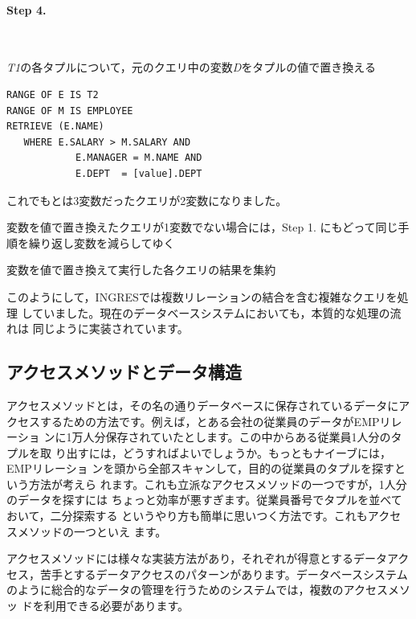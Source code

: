 \paragraph{Step 4.} \ 


{\it T1}の各タプルについて，元のクエリ中の変数{\it D}をタプルの値で置き換える

\begin{center}
 \begin{minipage}{0.8\textwidth}
  \begin{lstlisting}
RANGE OF E IS T2
RANGE OF M IS EMPLOYEE
RETRIEVE (E.NAME)
   WHERE E.SALARY > M.SALARY AND
            E.MANAGER = M.NAME AND
            E.DEPT  = [value].DEPT
  \end{lstlisting}
 \end{minipage}
\end{center}

これでもとは3変数だったクエリが2変数になりました。


変数を値で置き換えたクエリが1変数でない場合には，Step 1. にもどって同じ手順を繰り返し変数を減らしてゆく


変数を値で置き換えて実行した各クエリの結果を集約

このようにして，INGRESでは複数リレーションの結合を含む複雑なクエリを処理
していました。現在のデータベースシステムにおいても，本質的な処理の流れは
同じように実装されています。

\subsection{アクセスメソッドとデータ構造}


アクセスメソッドとは，その名の通りデータベースに保存されているデータにア
クセスするための方法です。例えば，とある会社の従業員のデータがEMPリレーショ
ンに1万人分保存されていたとします。この中からある従業員1人分のタプルを取
り出すには，どうすればよいでしょうか。もっともナイーブには，EMPリレーショ
ンを頭から全部スキャンして，目的の従業員のタプルを探すという方法が考えら
れます。これも立派なアクセスメソッドの一つですが，1人分のデータを探すには
ちょっと効率が悪すぎます。従業員番号でタプルを並べておいて，二分探索する
というやり方も簡単に思いつく方法です。これもアクセスメソッドの一つといえ
ます。


アクセスメソッドには様々な実装方法があり，それぞれが得意とするデータアク
セス，苦手とするデータアクセスのパターンがあります。データベースシステム
のように総合的なデータの管理を行うためのシステムでは，複数のアクセスメソッ
ドを利用できる必要があります。


